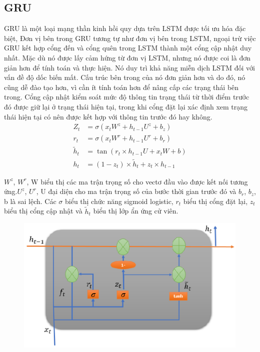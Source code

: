 \documentclass[conference]{IEEEtran}
\begin{document}
\subsection{GRU}
GRU là một loại mạng thần kinh hồi quy dựa trên LSTM được tối ưu hóa đặc biệt, Đơn vị bên trong GRU tương tự như đơn vị bên trong LSTM, ngoại trừ việc GRU kết hợp cổng đến và cổng quên trong LSTM thành một cổng cập nhật duy nhất.
Mặc dù nó được lấy cảm hứng từ đơn vị LSTM, nhưng nó được coi là đơn giản hơn để tính toán và thực hiện. Nó duy trì khả năng miễn dịch LSTM đối với vấn đề độ dốc biến mất. Cấu trúc bên trong của nó đơn giản hơn và do đó, nó cũng dễ đào tạo hơn, vì cần ít tính toán hơn để nâng cấp các trạng thái bên trong. Cổng cập nhật kiểm soát mức độ thông tin trạng thái từ thời điểm trước đó được giữ lại ở trạng thái hiện tại, trong khi cổng đặt lại xác định xem trạng thái hiện tại có nên được kết hợp với thông tin trước đó hay không.
\begin{align*}
Z_t &= \sigma(x_t W^z + h_{t-1} U^z + b_z) \\
r_t &= \sigma(x_t W^r + h_{t-1} U^r + b_r) \\
\tilde{h}_t &= \tan(r_t \times h_{t-1} U + x_t W + b) \\
h_t &= (1 - z_t) \times \tilde{h}_t + z_t \times h_{t-1}
\end{align*}

\(W^z\), \(W^r\), W biểu thị các ma trận trọng số cho vectơ đầu vào được kết nối tương ứng.\(U^z\), \(U^r\), U đại diện cho ma trận trọng số của bước thời gian trước đó và $b_r$, $b_z$, b là sai lệch. Các $\sigma$ biểu thị chức năng sigmoid logistic, $r_t$ biểu thị cổng đặt lại, $z_t$ biểu thị cổng cập nhật và $\tilde{h}_t$ biểu thị lớp ẩn ứng cử viên.
\begin{figure}[H]
    \centering
    \begin{minipage}{0.5\textwidth}
    \centering
    \includegraphics[width=1\textwidth]{Image/GRU.png}
    \label{fig:1}
    \end{minipage}
\end{figure}
\end{document}
